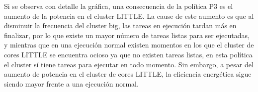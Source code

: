 Si se observa con detalle la gráfica, una consecuencia de la política P3 es
el aumento de la potencia en el cluster LITTLE. La cause de este aumento es
que al disminuir la frecuencia del cluster big, las tareas en ejecución
tardan más en finalizar, por lo que existe un mayor número de tareas listas
para ser ejecutadas, y mientras que en una ejecución normal existen
momentos en los que el cluster de cores LITTLE se encuentra ocioso ya que
no existen tareas listas, en esta política el cluster sí tiene tareas para
ejecutar en todo momento. Sin embargo, a pesar del aumento de potencia en el
cluster de cores LITTLE, la eficiencia energética sigue siendo mayor frente
a una ejecución normal.\\

\begin{figure}
  \centering
    \begin{subfigure}{0.75\textwidth}
      \centering
      \caption{\juno}
    \end{subfigure}

    \vspace{0.5cm}


\end{figure}
